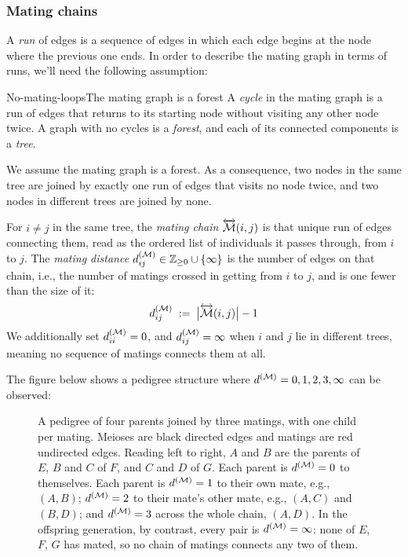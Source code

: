 \documentclass[12pt]{article}
\numberwithin{equation}{section}
\begin{document}
\subsubsection{Mating chains}
A \emph{run} of edges is a sequence of edges in which each edge begins at the node where the previous one ends.
In order to describe the mating graph in terms of runs, we'll need the following assumption:

\begin{assumption}{No-mating-loops}{The mating graph is a forest}
    A \emph{cycle} in the mating graph is a run of edges that returns to its starting node without visiting any other node twice.
    A graph with no cycles is a \emph{forest}, and each of its connected components is a \emph{tree}.

    We assume the mating graph is a forest.
    As a consequence, two nodes in the same tree are joined by exactly one run of edges that visits no node twice, and two nodes in different trees are joined by none.
\end{assumption}

For $i \neq j$ in the same tree, the \emph{mating chain} $\overleftrightarrow{\mathcal{M}}(i,j)$ is that unique run of edges connecting them, read as the ordered list of individuals it passes through, from $i$ to $j$.
The \emph{mating distance} $d^{(\mathcal{M})}_{ij} \in \mathbb{Z}_{\geq 0} \cup \{\infty\}$ is the number of edges on that chain, i.e., the number of matings crossed in getting from $i$ to $j$, and is one fewer than the size of it:
\begin{equation}\label{eq:mating-dist}
    d^{(\mathcal{M})}_{ij} \;:=\; \big|\overleftrightarrow{\mathcal{M}}(i,j)\big| - 1
\end{equation}
We additionally set $d^{(\mathcal{M})}_{ii} = 0$, and $d^{(\mathcal{M})}_{ij} = \infty$ when $i$ and $j$ lie in different trees, meaning no sequence of matings connects them at all.

The figure below shows a pedigree structure where $d^{(\mathcal{M})} = 0, 1, 2, 3, \infty$ can be observed:

\begin{figure}[H]
    \begin{floatcard}
        
        \caption{%
            A pedigree of four parents joined by three matings, with one child per mating.
            Meioses are black directed edges and matings are red undirected edges.
            Reading left to right, $A$ and $B$ are the parents of $E$, $B$ and $C$ of $F$, and $C$ and $D$ of $G$.
            Each parent is $d^{(\mathcal{M})} = 0$ to themselves.
            Each parent is $d^{(\mathcal{M})} = 1$ to their own mate, e.g., $(A,B)$; $d^{(\mathcal{M})} = 2$ to their mate's other mate, e.g., $(A,C)$ and $(B,D)$; and $d^{(\mathcal{M})} = 3$ across the whole chain, $(A,D)$.
            In the offspring generation, by contrast, every pair is $d^{(\mathcal{M})} = \infty$: none of $E$, $F$, $G$ has mated, so no chain of matings connects any two of them.%
        }
        \label{fig:step-sib}
    \end{floatcard}
\end{figure}
\end{document}
